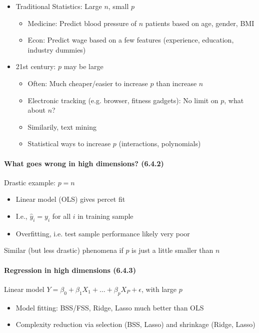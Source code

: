 \documentclass[11pt,a4paper,numbers=endperiod]{scrartcl}
\begin{document}
{\begin{itemize}
	\item Traditional Statistics: Large $n$, small $p$ \begin{itemize}
		\item Medicine: Predict blood pressure of $n$ patients based on age, gender, BMI 
		\item Econ: Predict wage based on a few features (experience, education, industry dummies)
	\end{itemize}
	\item 21st century: $p$ may be large \begin{itemize}
		\item Often: Much cheaper/easier to increase $p$ than increase $n$
		\item Electronic tracking (e.g. browser, fitness gadgets): No limit on $p$, what about $n$?
		\item Similarily, text mining
		\item Statistical ways to increase $p$ (interactions, polynomials)
	\end{itemize}
\end{itemize}

\paragraph{What goes wrong in high dimensions? (6.4.2)} 
$ $\\ 

Drastic example: $p = n$ \begin{itemize}
	\item Linear model (OLS) gives percet fit
	\item I.e., $\hat{y}_i = y_i$ for all $i$ in training sample
	\item Overfitting, i.e. test sample performance likely very poor
\end{itemize}
Similar (but less drastic) phenomena if $p$ is just a little smaller than $n$

\paragraph{Regression in high dimensions (6.4.3)} 
$ $\\

Linear model $Y = \beta_0 + \beta_1X_1 + \ldots + \beta_pX_P + \epsilon$, with large $p$ \begin{itemize}
	\item Model fitting: BSS/FSS, Ridge, Lasso much better than OLS
	\item Complexity reduction via selection (BSS, Lasso) and shrinkage (Ridge, Lasso)
\end{itemize}

}
\end{document}
